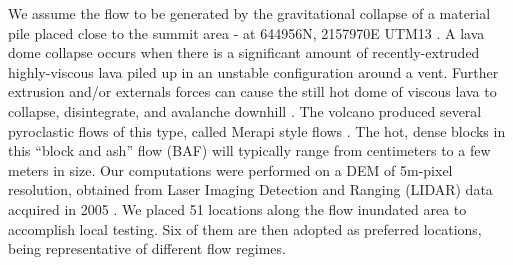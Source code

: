 \documentclass{article}
\begin{document}
We assume the flow to be generated by the gravitational collapse of a material pile placed close to the summit area - at 644956N, 2157970E UTM13 \citep{Rupp2006,Aghakhani2016}. A lava dome collapse occurs when there is a significant amount of recently-extruded highly-viscous lava piled up in an unstable configuration around a vent. Further extrusion and/or externals forces can cause the still hot dome of viscous lava to collapse, disintegrate, and avalanche downhill \citep{Bursik2005, Wolpert2016, Hyman2018}. The volcano produced several pyroclastic flows of this type, called Merapi style flows \citep{Macorps2018}. The hot, dense blocks in this ``block and ash'' flow (BAF) will typically range from centimeters to a few meters in size. Our computations were performed on a DEM of 5m-pixel resolution, obtained from Laser Imaging Detection and Ranging (LIDAR) data acquired in 2005 \citep{Davila2007, Sulpizio2010}. We placed 51 locations along the flow inundated area to accomplish local testing. Six of them are then adopted as preferred locations, being representative of different flow regimes.
\end{document}
